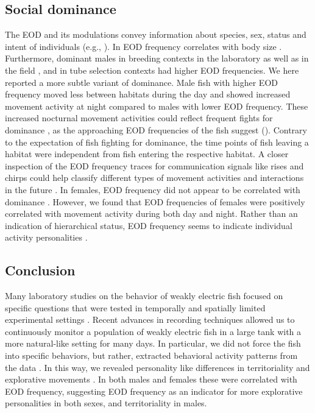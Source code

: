 \subsection{Social dominance}
The EOD and its modulations convey information about species, sex, status and intent of individuals (e.g., \citealp{Hagedorn1985, Stamper2010, Fugere2011}). In \lepto{} EOD frequency correlates with body size \citep{Dunlap2002b, Triefenbach2003}. Furthermore, dominant males in breeding contexts in the laboratory \citep{Hagedorn1985} as well as in the field \citep{Henninger2018}, and in tube selection contexts \citep{Dunlap2002, Fugere2011} had higher EOD frequencies. We here reported a more subtle variant of dominance. Male fish
with higher EOD frequency moved less between habitats during the day and showed increased movement activity at night compared to males with lower EOD frequency. These increased
nocturnal movement activities could reflect frequent fights for dominance \citep{Tallarovic2005}, as the approaching EOD frequencies of the fish suggest (). Contrary to the expectation of fish fighting for dominance, the time points of fish leaving a habitat were independent from fish entering the respective habitat. A closer inspection of the EOD frequency traces for communication signals like rises and chirps \citep{Zakon2002} could help classify different types of movement activities and interactions in the future \citep{Triefenbach2008}. In females, EOD frequency did not appear to be correlated with dominance \citep{Dunlap2002}. However, we found that EOD frequencies of females were positively correlated with movement activity during both day
and night. Rather than an indication of hierarchical status, EOD frequency seems to indicate individual activity personalities \citep{Sih2004}.

\subsection{Conclusion}
Many laboratory studies on the behavior of weakly electric fish focused on specific questions that were tested in temporally and spatially limited experimental settings \citep{Hopkins1974,Hagedorn1985,Nelson1999,Tallarovic2002,Hupe2008,Triefenbach2008}. Recent advances in recording techniques \citep{Madhav2018,Henninger2018} allowed us to continuously monitor a population of weakly electric fish in a large tank with a more natural-like setting for many days. In particular, we did not force the fish into specific behaviors,
but rather, extracted behavioral activity patterns from the data \citep{Gomez2014}. In this way, we revealed personality like differences in territoriality and explorative movements
\citep{Sih2004}. In both males and females these were correlated with EOD frequency, suggesting EOD frequency as an indicator for more explorative personalities in both sexes, and territoriality in males.

%
%
